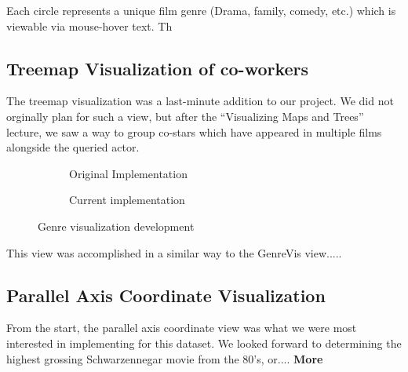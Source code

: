 \documentclass[12pt]{article}
\begin{document}
Each circle represents a unique film genre (Drama, family, comedy, etc.) which is viewable via mouse-hover text.  Th

\subsection{Treemap Visualization of co-workers}


The treemap visualization was a last-minute addition to our project.  We did not orginally plan for such a view, but after the ``Visualizing Maps and Trees'' lecture, we saw a way to group co-stars which have appeared in multiple films alongside the queried actor.

	\begin{figure}[h!]
		\centering
		\begin{subfigure}[t]{.5\textwidth}
		  \centering
		  \caption{Original Implementation}
		  \label{fig:treemapA}
		\end{subfigure}%
		\begin{subfigure}[t]{.8\textwidth}
		  \centering
		  \caption{Current implementation}
		  \label{fig:treemapB}
		\end{subfigure}%
		\caption{Genre visualization development}
		\label{fig:Treemap}
	\end{figure}
	
This view was accomplished in a similar way to the GenreVis view.....	

\subsection{Parallel Axis Coordinate Visualization}
	
From the start, the parallel axis coordinate view was what we were most interested in implementing for this dataset.  We looked forward to determining the highest grossing Schwarzennegar movie from the 80's, or.... \textbf{More}
\end{document}
